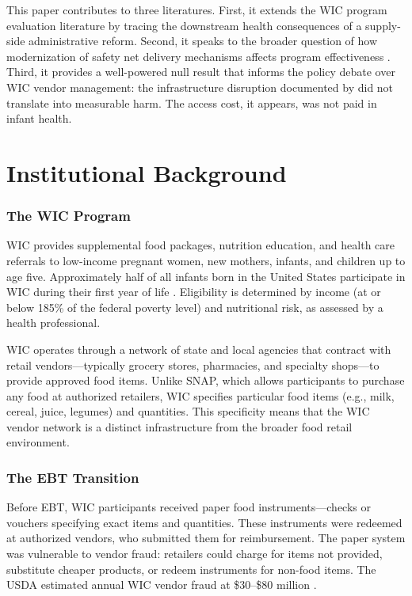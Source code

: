 \documentclass[12pt]{article}
\begin{document}
This paper contributes to three literatures. First, it extends the WIC program evaluation literature \citep{rossin2011, hoynes2011, almond2011} by tracing the downstream health consequences of a supply-side administrative reform. Second, it speaks to the broader question of how modernization of safety net delivery mechanisms affects program effectiveness \citep{muralidharan2016, banerjee2020, finkelstein2019}. Third, it provides a well-powered null result that informs the policy debate over WIC vendor management: the infrastructure disruption documented by \citet{meckel2020} did not translate into measurable harm. The access cost, it appears, was not paid in infant health.

\section{Institutional Background}

\subsubsection*{The WIC Program} WIC provides supplemental food packages, nutrition education, and health care referrals to low-income pregnant women, new mothers, infants, and children up to age five. Approximately half of all infants born in the United States participate in WIC during their first year of life \citep{oliveira2002}. Eligibility is determined by income (at or below 185\% of the federal poverty level) and nutritional risk, as assessed by a health professional.

WIC operates through a network of state and local agencies that contract with retail vendors---typically grocery stores, pharmacies, and specialty shops---to provide approved food items. Unlike SNAP, which allows participants to purchase any food at authorized retailers, WIC specifies particular food items (e.g., milk, cereal, juice, legumes) and quantities. This specificity means that the WIC vendor network is a distinct infrastructure from the broader food retail environment.

\subsubsection*{The EBT Transition} Before EBT, WIC participants received paper food instruments---checks or vouchers specifying exact items and quantities. These instruments were redeemed at authorized vendors, who submitted them for reimbursement. The paper system was vulnerable to vendor fraud: retailers could charge for items not provided, substitute cheaper products, or redeem instruments for non-food items. The USDA estimated annual WIC vendor fraud at \$30--\$80 million \citep{usda2010}.
\end{document}
